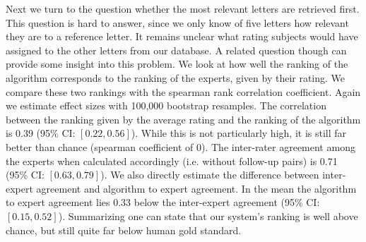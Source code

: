 Next we turn to the question whether the most relevant letters are retrieved first. This question is hard to answer, since we only know of five letters how relevant they are to a reference letter. It remains unclear what rating subjects would have assigned to the other letters from our database. A related question though can provide some insight into this problem. We look at how well the ranking of the algorithm corresponds to the ranking of the experts, given by their rating. We compare these two rankings with the spearman rank correlation coefficient. Again we estimate effect sizes with 100,000 bootstrap resamples. The correlation between the ranking given by the average rating and the ranking of the algorithm is 0.39 (95\% CI: $[0.22, 0.56]$). While this is not particularly high, it is still far better than chance (spearman coefficient of 0). The inter-rater agreement among the experts when calculated accordingly (i.e. without follow-up pairs) is 0.71 (95\% CI: $[0.63, 0.79]$). We also directly estimate the difference between inter-expert agreement and algorithm to expert agreement. In the mean the algorithm to expert agreement lies 0.33 below the inter-expert agreement (95\% CI: $[0.15, 0.52]$). Summarizing one can state that our system's ranking is well above chance, but still quite far below human gold standard.





